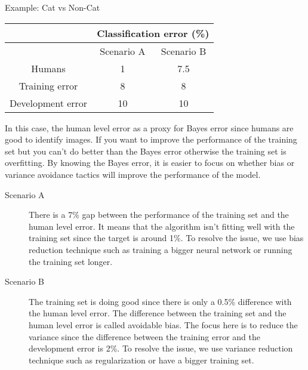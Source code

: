 Example: Cat vs Non-Cat
\begin{center}
\begin{tabular}{ |c|c|c| } 
 \hline
  & \multicolumn{2}{c}{Classification error (\%)} \\ 
 \hline
  & Scenario A & Scenario B \\ 
 \hline
 Humans & 1 & 7.5 \\
 \hline
 Training error & 8 & 8 \\ 
 \hline
 Development error & 10 & 10 \\
 \hline
\end{tabular}
\end{center}
In this case, the human level error as a proxy for Bayes error since humans are good to identify images. If you want to improve the performance of the training set but you can’t do better than the Bayes error otherwise the training set is overfitting. By knowing the Bayes error, it is easier to focus on whether bias or variance avoidance tactics will improve the performance of the model.
\begin{description}
  \item[Scenario A] There is a 7\% gap between the performance of the training set and the human level error. It means that the algorithm isn’t fitting well with the training set since the target is around 1\%. To resolve the issue, we use bias reduction technique such as training a bigger neural network or running the training set longer.
  \item[Scenario B] The training set is doing good since there is only a 0.5\% difference with the human level error. The difference between the training set and the human level error is called avoidable bias. The focus here is to reduce the variance since the difference between the training error and the development error is 2\%. To resolve the issue, we use variance reduction technique such as regularization or have a bigger training set.
\end{description}

